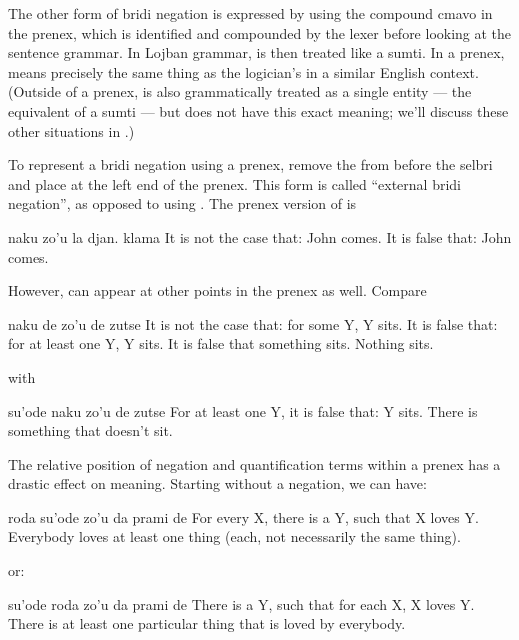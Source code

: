 The other form of bridi negation is expressed by using the
    compound cmavo  in the prenex, which is identified and
    compounded by the lexer before looking at the sentence grammar.
    In Lojban grammar,  is then treated like a sumti. In a
    prenex,  means precisely the same thing as the
    logician's  in a similar English
    context. (Outside of a prenex,  is also grammatically
    treated as a single entity --- the equivalent of a sumti ---
    but does not have this exact meaning; we'll discuss these other
    situations in .) 

To represent a bridi negation using a prenex, remove the
     from before the selbri and place  at the left
    end of the prenex. This form is called ``external bridi
    negation'', as opposed to  using
    . The prenex version of 
    is
\begin{example}
naku zo'u la djan. klama\n
It is not the case that: John comes.\n
It is false that: John comes.
\end{example}

However,  can appear at other points in the prenex as
    well. Compare
\begin{example}
naku de zo'u de zutse\n
It is not the case that: for some Y, Y sits.\n
It is false that: for at least one Y, Y sits.\n
It is false that something sits.\n
Nothing sits.
\end{example}

{\noindent}with
\begin{example}
su'ode naku zo'u de zutse\n
For at least one Y, it is false that: Y sits.\n
There is something that doesn't sit.
\end{example}

The relative position of negation and quantification terms
    within a prenex has a drastic effect on meaning. Starting
    without a negation, we can have:
\begin{example}
roda su'ode zo'u da prami de\n
For every X, there is a Y, such that X loves Y.\n
Everybody loves at least one thing (each,\n
\T	not necessarily the same thing).
\end{example}

{\noindent}or:
\begin{example}
su'ode roda zo'u da prami de\n
There is a Y, such that for each X, X loves Y.\n
There is at least one particular thing\n
\T	that is loved by everybody.
\end{example}

